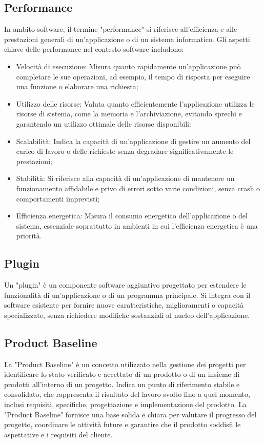 \documentclass{article}
\begin{document}
\subsection{Performance}
In ambito software, il termine "performance" si riferisce all'efficienza e alle prestazioni generali di un'applicazione o di un sistema informatico. Gli aspetti chiave delle performance nel contesto software includono:
\begin{itemize}
    \item Velocità di esecuzione: Misura quanto rapidamente un'applicazione può completare le sue operazioni, ad esempio, il tempo di risposta per eseguire una funzione o elaborare una richiesta;
    \item Utilizzo delle risorse: Valuta quanto efficientemente l'applicazione utilizza le risorse di sistema, come la memoria e l'archiviazione, evitando sprechi e garantendo un utilizzo ottimale delle risorse disponibili:
    \item Scalabilità: Indica la capacità di un'applicazione di gestire un aumento del carico di lavoro o delle richieste senza degradare significativamente le prestazioni;
    \item Stabilità: Si riferisce alla capacità di un'applicazione di mantenere un funzionamento affidabile e privo di errori sotto varie condizioni, senza crash o comportamenti imprevisti;
    \item Efficienza energetica: Misura il consumo energetico dell'applicazione o del sistema, essenziale soprattutto in ambienti in cui l'efficienza energetica è una priorità.
\end{itemize}

\subsection{Plugin}
Un "plugin" è un componente software aggiuntivo progettato per estendere le funzionalità di un'applicazione o di un programma principale. Si integra con il software esistente per fornire nuove caratteristiche, miglioramenti o capacità specializzate, senza richiedere modifiche sostanziali al nucleo dell'applicazione. 

\subsection{Product Baseline}
La "Product Baseline" è un concetto utilizzato nella gestione dei progetti per identificare lo stato verificato e accettato di un prodotto o di un insieme di prodotti all'interno di un progetto. Indica un punto di riferimento stabile e consolidato, che rappresenta il risultato del lavoro svolto fino a quel momento, inclusi requisiti, specifiche, progettazione e implementazione del prodotto. La "Product Baseline" fornisce una base solida e chiara per valutare il progresso del progetto, coordinare le attività future e garantire che il prodotto soddisfi le aspettative e i requisiti del cliente.
\end{document}

